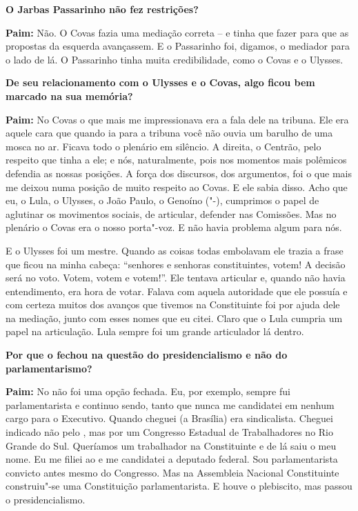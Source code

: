 \textbf{O Jarbas Passarinho não fez restrições?}

\textbf{Paim:} Não. O Covas fazia uma mediação correta -- e tinha que
fazer para que as propostas da esquerda avançassem. E o Passarinho foi,
digamos, o mediador para o lado de lá. O Passarinho tinha muita
credibilidade, como o Covas e o Ulysses.

\textbf{De seu relacionamento com o Ulysses e o Covas, algo ficou bem
marcado na sua memória?}

\textbf{Paim:} No Covas o que mais me impressionava era a fala dele na
tribuna. Ele era aquele cara que quando ia para a tribuna você não ouvia
um barulho de uma mosca no ar. Ficava todo o plenário em silêncio. A
direita, o Centrão, pelo respeito que tinha a ele; e nós, naturalmente,
pois nos momentos mais polêmicos defendia as nossas posições. A força
dos discursos, dos argumentos, foi o que mais me deixou numa posição de
muito respeito ao Covas. E ele sabia disso. Acho que eu, o Lula, o
Ulysses, o João Paulo, o Genoíno ("-), cumprimos o papel de aglutinar
os movimentos sociais, de articular, defender nas Comissões. Mas no
plenário o Covas era o nosso porta"-voz. E não havia problema algum para
nós.

E o Ulysses foi um mestre. Quando as coisas todas embolavam ele trazia a
frase que ficou na minha cabeça: ``senhores e senhoras constituintes,
votem! A decisão será no voto. Votem, votem e votem!''. Ele tentava
articular e, quando não havia entendimento, era hora de votar. Falava
com aquela autoridade que ele possuía e com certeza muitos dos avanços
que tivemos na Constituinte foi por ajuda dele na mediação, junto com
esses nomes que eu citei. Claro que o Lula cumpria um papel na
articulação. Lula sempre foi um grande articulador lá dentro.

\textbf{Por que o  fechou na questão do presidencialismo e não do
parlamentarismo?}

\textbf{Paim:} No  não foi uma opção fechada. Eu, por exemplo, sempre
fui parlamentarista e continuo sendo, tanto que nunca me candidatei em
nenhum cargo para o Executivo. Quando cheguei (a Brasília) era
sindicalista. Cheguei indicado não pelo , mas por um Congresso
Estadual de Trabalhadores no Rio Grande do Sul. Queríamos um trabalhador
na Constituinte e de lá saiu o meu nome. Eu me filiei ao  e me
candidatei a deputado federal. Sou parlamentarista convicto antes mesmo
do Congresso. Mas na Assembleia Nacional Constituinte construiu"-se uma
Constituição parlamentarista. E houve o plebiscito, mas passou o
presidencialismo.

